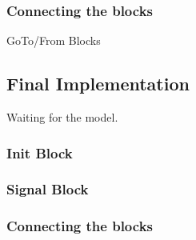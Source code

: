 \subsubsection{Connecting the blocks}
GoTo/From Blocks

\subsection{Final Implementation}\label{sec:simfinim}
Waiting for the model.
\subsubsection{Init Block}
\subsubsection{Signal Block}
\subsubsection{Connecting the blocks}


